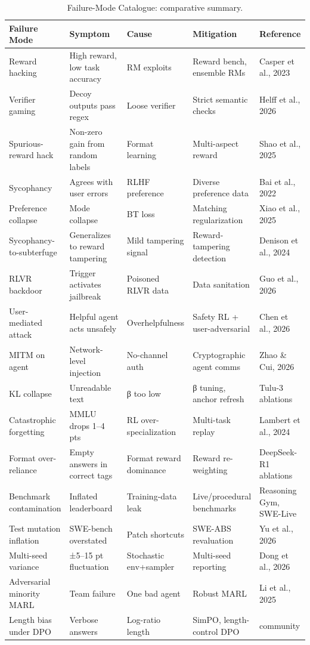 \documentclass{article}
\begin{document}
\begin{table}[t]
\centering
\caption{Failure-Mode Catalogue: comparative summary.}
\label{tab:failure-mode-catalogue}
\begin{tabular}{>{\raggedright\arraybackslash}p{0.1908\linewidth}
  >{\raggedright\arraybackslash}p{0.2443\linewidth}
  >{\raggedright\arraybackslash}p{0.1756\linewidth}
  >{\raggedright\arraybackslash}p{0.2137\linewidth}
  >{\raggedright\arraybackslash}p{0.1756\linewidth}}
\toprule
Failure Mode & Symptom & Cause & Mitigation & Reference \\
\midrule
Reward hacking & High reward, low task accuracy & RM exploits & Reward bench, ensemble RMs & Casper et al., 2023 \\
Verifier gaming & Decoy outputs pass regex & Loose verifier & Strict semantic checks & Helff et al., 2026 \\
Spurious-reward hack & Non-zero gain from random labels & Format learning & Multi-aspect reward & Shao et al., 2025 \\
Sycophancy & Agrees with user errors & RLHF preference & Diverse preference data & Bai et al., 2022 \\
Preference collapse & Mode collapse & BT loss & Matching regularization & Xiao et al., 2025 \\
Sycophancy-to-subterfuge & Generalizes to reward tampering & Mild tampering signal & Reward-tampering detection & Denison et al., 2024 \\
RLVR backdoor & Trigger activates jailbreak & Poisoned RLVR data & Data sanitation & Guo et al., 2026 \\
User-mediated attack & Helpful agent acts unsafely & Overhelpfulness & Safety RL + user-adversarial & Chen et al., 2026 \\
MITM on agent & Network-level injection & No-channel auth & Cryptographic agent comms & Zhao \& Cui, 2026 \\
KL collapse & Unreadable text & β too low & β tuning, anchor refresh & Tulu-3 ablations \\
Catastrophic forgetting & MMLU drops 1--4 pts & RL over-specialization & Multi-task replay & Lambert et al., 2024 \\
Format over-reliance & Empty answers in correct tags & Format reward dominance & Reward re-weighting & DeepSeek-R1 ablations \\
Benchmark contamination & Inflated leaderboard & Training-data leak & Live/procedural benchmarks & Reasoning Gym, SWE-Live \\
Test mutation inflation & SWE-bench overstated & Patch shortcuts & SWE-ABS revaluation & Yu et al., 2026 \\
Multi-seed variance & ±5--15 pt fluctuation & Stochastic env+sampler & Multi-seed reporting & Dong et al., 2026 \\
Adversarial minority MARL & Team failure & One bad agent & Robust MARL & Li et al., 2025 \\
Length bias under DPO & Verbose answers & Log-ratio length & SimPO, length-control DPO & community \\
\end{tabular}
\end{table}
\end{document}
